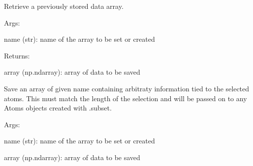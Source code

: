 \documentclass[letterpaper,10pt,english]{sphinxmanual}
\begin{document}
\begin{fulllineitems}
\begin{fulllineitems}
\end{fulllineitems}


\begin{fulllineitems}
\label{doctree/soprano.selection:soprano.selection.AtomSelection.get_array}
Retrieve a previously stored data array.

\begin{DUlineblock}{0em}
\item[] Args:
\item[]
\begin{DUlineblock}{\DUlineblockindent}
\item[] name (str): name of the array to be set or created
\end{DUlineblock}
\end{DUlineblock}

\begin{DUlineblock}{0em}
\item[] Returns:
\item[]
\begin{DUlineblock}{\DUlineblockindent}
\item[] array (np.ndarray): array of data to be saved
\end{DUlineblock}
\end{DUlineblock}

\end{fulllineitems}


\begin{fulllineitems}
\label{doctree/soprano.selection:soprano.selection.AtomSelection.indices}
\end{fulllineitems}


\begin{fulllineitems}
\label{doctree/soprano.selection:soprano.selection.AtomSelection.set_array}
Save an array of given name containing arbitraty information
tied to the selected atoms.
This must match the length of the selection and will be passed on to
any Atoms objects created with .subset.

\begin{DUlineblock}{0em}
\item[] Args:
\item[]
\begin{DUlineblock}{\DUlineblockindent}
\item[] name (str): name of the array to be set or created
\item[] array (np.ndarray): array of data to be saved
\end{DUlineblock}
\end{DUlineblock}


\end{fulllineitems}
\end{fulllineitems}
\end{document}
